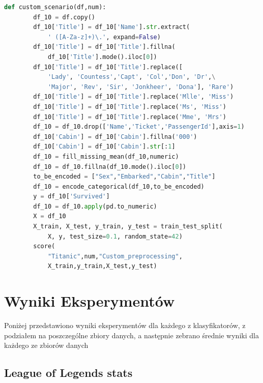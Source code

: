 \documentclass{book}
\begin{document}
\begin{lstlisting}[language=Python, caption={Usuwanie 
    wartości odstających}, captionpos=b]
    def custom_scenario(df,num):
        df_10 = df.copy()
        df_10['Title'] = df_10['Name'].str.extract(
            ' ([A-Za-z]+)\.', expand=False)
        df_10['Title'] = df_10['Title'].fillna(
            df_10['Title'].mode().iloc[0])
        df_10['Title'] = df_10['Title'].replace([
            'Lady', 'Countess','Capt', 'Col','Don', 'Dr',\
            'Major', 'Rev', 'Sir', 'Jonkheer', 'Dona'], 'Rare')
        df_10['Title'] = df_10['Title'].replace('Mlle', 'Miss')
        df_10['Title'] = df_10['Title'].replace('Ms', 'Miss')
        df_10['Title'] = df_10['Title'].replace('Mme', 'Mrs')
        df_10 = df_10.drop(['Name','Ticket','PassengerId'],axis=1)
        df_10['Cabin'] = df_10['Cabin'].fillna('000')
        df_10['Cabin'] = df_10['Cabin'].str[:1]
        df_10 = fill_missing_mean(df_10,numeric)
        df_10 = df_10.fillna(df_10.mode().iloc[0])
        to_be_encoded = ["Sex","Embarked","Cabin","Title"]
        df_10 = encode_categorical(df_10,to_be_encoded)
        y = df_10['Survived']
        df_10 = df_10.apply(pd.to_numeric)
        X = df_10
        X_train, X_test, y_train, y_test = train_test_split(
            X, y, test_size=0.1, random_state=42)
        score(
            "Titanic",num,"Custom_preprocessing",
            X_train,y_train,X_test,y_test)
\end{lstlisting}

\chapter{Wyniki Eksperymentów}

Poniżej przedstawiono wyniki eksperymentów dla każdego z klasyfikatorów, 
z podziałem na poszczególne zbiory danych, a następnie zebrano średnie wyniki dla każdego 
ze zbiorów danych

\section{League of Legends stats}
\end{document}
